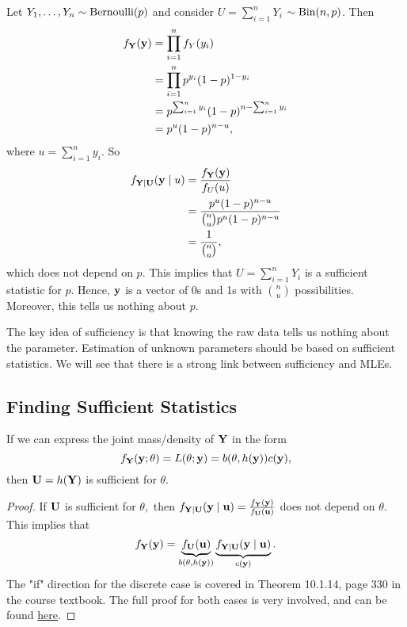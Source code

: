 \begin{eg}
Let $Y_1,\ldots, Y_n\sim \operatorname*{Bernoulli}(p)$ and consider $U=\sum^n_{i=1}Y_i$ $\sim \operatorname*{Bin}(n,p)$. Then
\begin{align*}
    f_\mathbf Y(\mathbf y)&=\prod^n_{i=1}f_Y(y_i)\\
    &=\prod^n_{i=1}p^{y_i}(1-p)^{1-y_i} \\
    &=p^{\sum^n_{i=1}y_i}(1-p)^{n-\sum^n_{i=1}y_i}\\
    &=p^u(1-p)^{n-u},
\end{align*}
where $u=\sum^n_{i=1}y_i.$ So
\begin{align*}
f_{\mathbf Y\mid \mathbf U}{(\mathbf y\mid u)}&=\frac{f_\mathbf Y(\mathbf y)}{f_U(u)} \\
    &=\frac{p^u(1-p)^{n-u}}{\binom{n}{u}p^u(1-p)^{n-u}} \\
    &=\frac{1}{\binom{n}{u}},
\end{align*}
which does not depend on $p.$ This implies that $U=\sum^n_{i=1}Y_i$ is a sufficient statistic for $p.$ Hence, $\mathbf y$ is a vector of 0s and 1s with $\binom{n}{u}$ possibilities. Moreover, this tells us nothing about $p.$
\end{eg}
\begin{remark}
The key idea of sufficiency is that knowing the raw data tells us nothing about the parameter. Estimation of unknown parameters should be based on sufficient statistics. We will see that there is a strong link between sufficiency and MLEs.
\end{remark}

\subsection{Finding Sufficient Statistics}
\begin{theorem}
If we can express the joint \phantom{xxx} \linebreak mass/density of $\mathbf Y$ in the form
$$
f_\mathbf Y(\mathbf y;\theta)=L(\theta;\mathbf y)=b(\theta,h(\mathbf y))c(\mathbf y),
$$
then $\mathbf U=h(\mathbf Y)$ is sufficient for $\theta.$ 
\end{theorem}
\begin{proof}
If $\mathbf U$ is sufficient for $\theta,$ then $f_{\mathbf Y\mid \mathbf U}(\mathbf y\mid \mathbf u)=\frac{f_\mathbf Y(\mathbf y)}{f_\mathbf U(\mathbf u)}$ does not depend on $\theta.$ This implies that
$$
f_\mathbf Y(\mathbf y)=\underbrace{f_\mathbf U(\mathbf u)}_{b(\theta,h(\mathbf y))}\underbrace{f_{\mathbf Y\mid\mathbf U}(\mathbf y\mid \mathbf u)}_{c(\mathbf y)}.
$$
The "if" direction for the discrete case is covered in Theorem 10.1.14, page 330 in the course textbook. The full proof for both cases is very involved, and can be found \href{https://en.wikipedia.org/wiki/Sufficient_statistic#Fisher%E2%80%93Neyman_factorization_theorem}{here}.
\end{proof}

